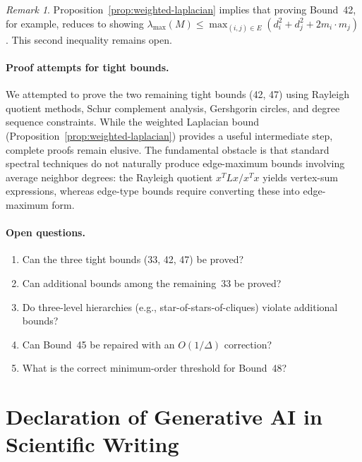 \documentclass[preprint,12pt]{elsarticle}
\theoremstyle{definition}
\theoremstyle{remark}
\newtheorem{remark}[theorem]{Remark}
\begin{document}
\begin{remark}\label{rem:weighted-laplacian-gap}
  Proposition~\ref{prop:weighted-laplacian} implies that proving Bound~42,
  for example, reduces to showing
  $\lambda_{\max}(M) \leq \max_{(i,j) \in E}(d_i^2 + d_j^2 + 2m_i \cdot m_j)$.
  This second inequality remains open.
\end{remark}

\paragraph{Proof attempts for tight bounds.}
We attempted to prove the two remaining tight bounds (42, 47) using Rayleigh
quotient methods, Schur complement analysis, Gershgorin circles, and degree
sequence constraints.  While the weighted Laplacian bound
(Proposition~\ref{prop:weighted-laplacian}) provides a useful intermediate
step, complete proofs remain elusive.
The fundamental obstacle is that standard spectral techniques do not
naturally produce edge-maximum bounds involving average neighbor degrees:
the Rayleigh quotient $x^T L x / x^T x$ yields vertex-sum expressions,
whereas edge-type bounds require converting these into edge-maximum form.

\paragraph{Open questions.}
\begin{enumerate}[label=(\alph*)]
  \item Can the three tight bounds (33, 42, 47) be proved?
  \item Can additional bounds among the remaining~33 be proved?
  \item Do three-level hierarchies (e.g., star-of-stars-of-cliques)
    violate additional bounds?
  \item Can Bound~45 be repaired with an $O(1/\Delta)$ correction?
  \item What is the correct minimum-order threshold for Bound~48?
\end{enumerate}


\section*{Declaration of Generative AI in Scientific Writing}
\end{document}
